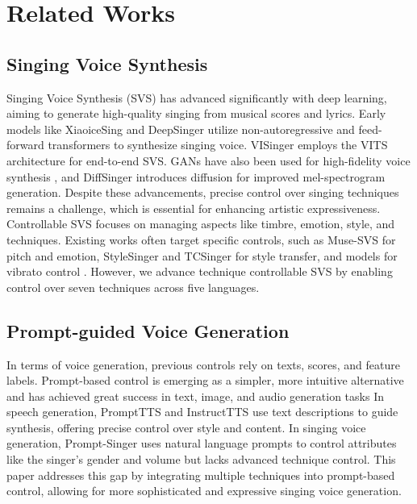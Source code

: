 \section{Related Works}
\subsection{Singing Voice Synthesis}

Singing Voice Synthesis (SVS) has advanced significantly with deep learning, aiming to generate high-quality singing from musical scores and lyrics. Early models like XiaoiceSing \citep{lu2020xiaoicesing} and DeepSinger \citep{ren2020deepsinger} utilize non-autoregressive and feed-forward transformers to synthesize singing voice. VISinger \citep{zhang2022visinger} employs the VITS \citep{kim2021conditional} architecture for end-to-end SVS. GANs have also been used for high-fidelity voice synthesis \citep{wu2020adversarially, huang2022singgan}, and DiffSinger \citep{liu2022diffsinger} introduces diffusion for improved mel-spectrogram generation.
Despite these advancements, precise control over singing techniques remains a challenge, which is essential for enhancing artistic expressiveness. Controllable SVS focuses on managing aspects like timbre, emotion, style, and techniques. Existing works often target specific controls, such as Muse-SVS \citep{kim2023muse} for pitch and emotion, StyleSinger \citep{zhang2024stylesinger} and TCSinger \cite{zhang2024tcsinger} for style transfer, and models for vibrato control \citep{liu2021vibrato, song2022singing, ikemiya2014transferring}. However, we advance technique controllable SVS by enabling control over seven techniques across five languages.

\subsection{Prompt-guided Voice Generation}
In terms of voice generation, previous controls rely on texts, scores, and feature labels. Prompt-based control is emerging as a simpler, more intuitive alternative and has achieved great success in text, image, and audio generation tasks \cite{brown2020language, ramesh2021zero, kreuk2022audiogen}
In speech generation, PromptTTS \citep{guo2023prompttts} and InstructTTS \citep{yang2023instructtts} use text descriptions to guide synthesis, offering precise control over style and content.
In singing voice generation, Prompt-Singer \citep{wang2024prompt} uses natural language prompts to control attributes like the singer's gender and volume but lacks advanced technique control. This paper addresses this gap by integrating multiple techniques into prompt-based control, allowing for more sophisticated and expressive singing voice generation.


